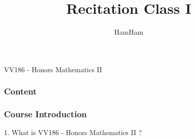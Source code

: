 \documentclass{beamer}
\title{\sffamily Recitation Class I}
\author{HamHam}
\begin{document}
    \begin{titlepage}
        \begin{center}
            VV186 - Honors Mathematics II
        \end{center}
    \end{titlepage}
    
    \begin{frame}

        \frametitle{Content}
        \tableofcontents
        
    \end{frame}

    \begin{frame}
        \frametitle{Course Introduction}
        1. What is VV186 - Honors Mathematics II ?

    \end{frame}
\end{document}
